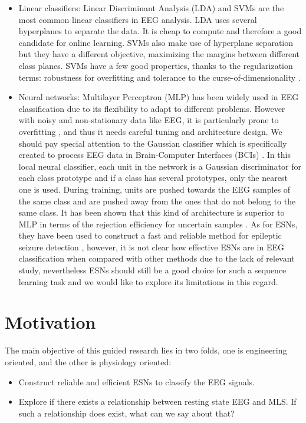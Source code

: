 \documentclass[a4paper,11pt,oneside]{article}
\begin{document}
\begin{itemize}
	\item Linear classifiers: Linear Discriminant Analysis (LDA)  and SVMs are the most common linear classifiers in EEG analysis. LDA uses several hyperplanes to separate the data. It is cheap to compute and therefore a good candidate for online learning. SVMs also make use of hyperplane separation but they have a different objective, maximizing the margins between different class planes. SVMs have a few good properties, thanks to the regularization terms:  robustness for overfitting and tolerance to the curse-of-dimensionality \cite{bennett2000support}.
	
	\item Neural networks: Multilayer Perceptron (MLP)  has been widely used in EEG classification \cite{anderson1996classification}\cite{palaniappan2005brain} due to its flexibility to adapt to different problems. However with noisy and non-stationary data like EEG, it is particularly prone to overfitting \cite{balakrishnan2005multilayer}, and thus it needs careful tuning and architecture design. We should pay special attention to the Gaussian classifier which is specifically created to process EEG data in Brain-Computer Interfaces (BCIs) \cite{millan2004noninvasive} \cite{millan2000local}. In this local neural classifier, each unit in the network is a Gaussian discriminator for each class prototype and if a class has several prototypes, only the nearest one is used. During training, units are pushed towards the EEG samples of the same class and are pushed away from the ones that do not belong to the same class. It has been shown that this kind of architecture is superior to MLP in terms of the rejection efficiency for uncertain samples \cite{millan2000local}. As for ESNs,  they have been used to construct a fast and reliable method for epileptic seizure detection \cite{buteneers2008real}, however, it is not clear how effective ESNs are in EEG classification when compared with other methods due to the lack of relevant study, nevertheless ESNs should still be a good choice for such a sequence learning task and we would like to explore its limitations in this regard.

\end{itemize}


\section{Motivation}
The main objective of this guided research lies in two folds, one is engineering oriented, and the other is physiology oriented:
\begin{itemize}
	\item Construct reliable and efficient ESNs to classify the EEG signals.
	\item Explore if there exists a relationship between resting state EEG and MLS. If such a relationship does exist, what can we say about that?
\end{itemize} 
\end{document}
